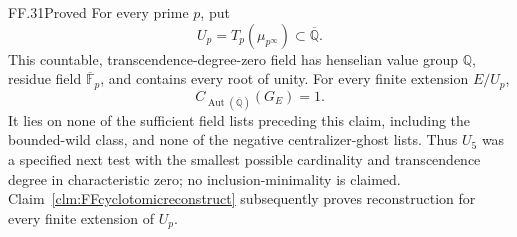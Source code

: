 \begin{claim}{FF.31}{Proved}\label{clm:FFcyclotomictest}
For every prime \(p\), put
\[
                   U_p=T_p(\mu_{p^\infty})
                       \subset\overline{\mathbb Q}.     \tag{FF.31.1}
\]
This countable, transcendence-degree-zero field has
henselian value group \(\mathbb Q\), residue field
\(\overline{\mathbb F}_p\), and contains every root
of unity. For every finite extension \(E/U_p\),
\[
           C_{\operatorname{Aut}(\overline{\mathbb Q})}
                         (G_E)=1.                       \tag{FF.31.2}
\]
It lies on none of the sufficient field lists
preceding this claim, including the bounded-wild class,
and none of the negative centralizer-ghost lists.
Thus \(U_5\) was a specified next test with the
smallest possible cardinality and transcendence degree
in characteristic zero; no inclusion-minimality is
claimed. Claim~\ref{clm:FFcyclotomicreconstruct}
subsequently proves reconstruction for every finite
extension of \(U_p\).
\end{claim}
